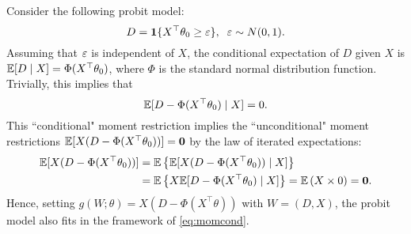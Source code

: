 \documentclass[11pt, A4paper, openany, uplatex]{book}
\begin{document}
\begin{example}\upshape\label{ex:probit}
	Consider the following probit model:
	\[
		D = \mathbf{1}\{X^\top\theta_0 \geq \varepsilon\}, \;\; \varepsilon \sim N(0,1).
	\]
	Assuming that $\varepsilon$ is independent of $X$, the conditional expectation of $D$ given $X$ is $\mathbb{E} [D \mid X] = \Phi(X^\top \theta_0)$, where $\Phi$ is the standard normal distribution function.
	Trivially, this implies that
	\[
		\mathbb{E}[D -  \Phi(X^\top \theta_0) \mid X] = 0.
	\]
	This ``conditional" moment restriction implies the ``unconditional" moment restrictions $\mathbb{E} [X (D -  \Phi(X^\top \theta_0))] = \mathbf{0}$ by the law of iterated expectations:
	\begin{align*}
	\mathbb{E} [X (D -  \Phi(X^\top \theta_0))] 
	& = \mathbb{E} \left\{ \mathbb{E}[X (D -  \Phi(X^\top \theta_0)) \mid X] \right\} \\
	& = \mathbb{E} \left\{ X \mathbb{E}[ D -  \Phi(X^\top \theta_0) \mid X] \right\} = \mathbb{E} \left( X \times 0 \right) = \mathbf{0}.
	\end{align*}
	Hence, setting $g(W; \theta) = X (D -  \Phi(X^\top \theta))$ with $W = (D,X)$, the probit model also fits in the framework of \eqref{eq:momcond}.
\end{example}
\end{document}
